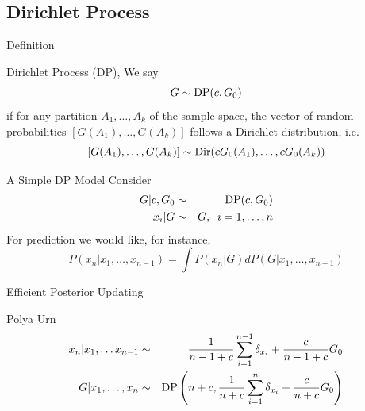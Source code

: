 \documentclass{beamer}
\begin{document}
\subsection{Dirichlet Process}

\begin{frame}[t]{Definition}
\begin{block}{Dirichlet Process (DP), \citet{Ferguson1973}}
We say
 \[G \sim \DP(c,G_0)\]
 if for any partition $A_1, \ldots, A_k$ of the sample space, the vector of random probabilities
$[G(A_1), \ldots, G(A_k)]$ follows a Dirichlet distribution, i.e.
\[[G(A_1), \ldots, G(A_k)] \sim \Dir(cG_0(A_1), \ldots, cG_0(A_k))\]
\end{block}
\end{frame}	

\begin{frame}[t]{A Simple DP Model}
Consider
\begin{eqnarray*}
G | c, G_0 &\sim& \DP(c,G_0) \\
x_i | G &\sim& G, \;\; i=1,\ldots,n
\end{eqnarray*}
For prediction we would like, for instance,  
\[P(x_n | x_1,\ldots,x_{n-1}) = \int P(x_n | G)dP(G | x_1, \ldots, x_{n-1})\]

\end{frame}

\begin{frame}[t]{Efficient Posterior Updating}
\begin{block}{Polya Urn \citep{Blackwell1973}}
\begin{eqnarray*}
x_n | x_1,\ldots x_{n-1} &\sim& \frac{1}{n-1+c}\sum_{i=1}^{n-1}\delta_{x_i} + \frac{c}{n-1+c}G_0 \\
G | x_1, \ldots, x_n &\sim& \DP\left(n+c, \frac{1}{n+c}\sum_{i=1}^n \delta_{x_i} + \frac{c}{n+c}G_0\right)
\end{eqnarray*}
\end{block}
\end{frame}	
\end{document}
